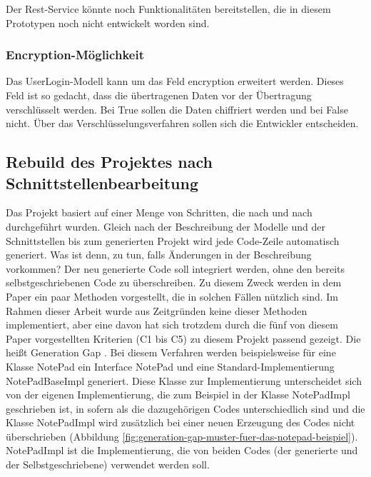 \documentclass[a4paper,twoside]{article}
\begin{document}
	Der Rest-Service k\"onnte noch Funktionalit\"aten bereit\-stellen, die in diesem Prototypen noch nicht ent\-wickelt worden sind.
	
	\subsubsection{Encryption-M\"oglichkeit}
	Das UserLogin-Modell kann um das Feld encryption erweitert werden. Dieses Feld ist so gedacht, dass die \"ubertragenen Daten vor der \"Ubertragung verschl\"usselt werden. Bei True sollen die Daten chiffriert werden und bei False nicht. \"Uber das Verschl\"usselungsverfahren sollen sich die Entwickler entscheiden.
	
	\subsection{Rebuild des Projektes nach Schnittstellenbearbeitung}
	
	Das Projekt basiert auf einer Menge von Schritten, die nach und nach durchgef\"uhrt wurden. Gleich nach der Beschreibung der Modelle und der Schnittstellen bis zum generierten Projekt wird jede Code-Zeile automatisch generiert. Was ist denn, zu tun, falls \"Anderungen in der Beschreibung vorkommen? Der neu generierte Code soll integriert werden, ohne den bereits selbstgeschriebenen Code zu \"uberschreiben. Zu diesem Zweck werden in dem Paper \cite{timo2015} ein paar Methoden vorgestellt, die in solchen F\"allen n\"utzlich sind. Im Rahmen dieser Arbeit wurde aus Zeitgr\"unden keine dieser Methoden implementiert, aber eine davon hat sich trotzdem durch die f\"unf von diesem Paper vorgestellten Kriterien (C1 bis C5) \cite{timo2015_3_1} zu diesem Projekt passend gezeigt. Die hei\ss{}t Generation Gap \cite{timo2015_3_1}.
	Bei diesem Verfahren werden beispielsweise f\"ur eine Klasse NotePad ein Interface NotePad und eine Standard-Implementierung NotePadBaseImpl generiert. Diese Klasse zur Implementierung unterscheidet sich von der eigenen Implementierung, die zum Beispiel in der Klasse NotePadImpl geschrieben ist, in sofern als die dazugeh\"origen Codes unterschiedlich sind und die Klasse NotePadImpl wird zus\"atzlich bei einer neuen Erzeugung des Codes nicht \"uberschrieben (Abbildung \ref{fig:generation-gap-muster-fuer-das-notepad-beispiel}). NotePadImpl ist die Implementierung, die von beiden Codes (der generierte und der Selbstgeschriebene) verwendet werden soll.
	
\end{document}
